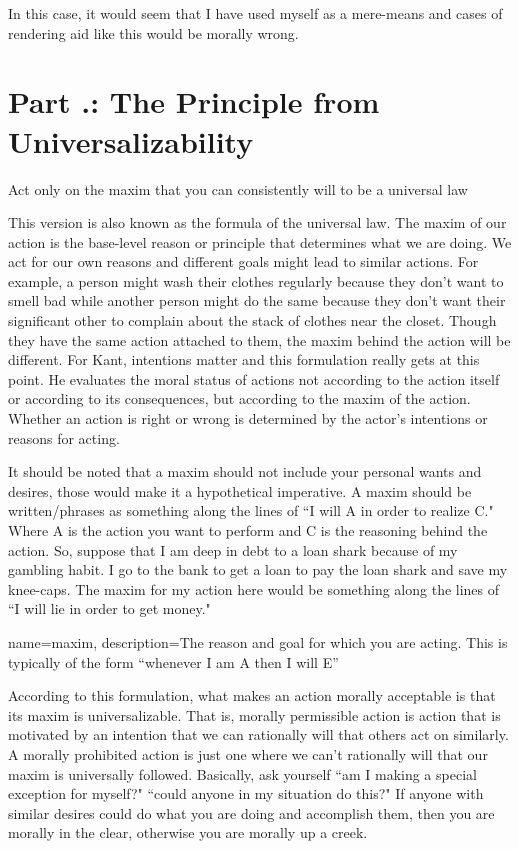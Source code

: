 In this case, it would seem that I have used myself as a mere-means and cases of rendering aid like this would be morally wrong.    
\section{Part \thechapcount.\theseccount: The Principle from Universalizability}
\begin{center}
Act only on the maxim that you can consistently will to be a universal law
\end{center}
This version is also known as the formula of the universal law. The maxim of our action is the base-level reason or principle that determines what we are doing. We act for our own reasons and different goals might lead to similar actions. For example, a person might wash their clothes regularly because they don't want to smell bad while another person might do the same because they don't want their significant other to complain about the stack of clothes near the closet. Though they have the same action attached to them, the maxim behind the action will be different.  For Kant, intentions matter and this formulation really gets at this point. He evaluates the moral status of actions not according to the action itself or according to its consequences, but according to the maxim of the action. Whether an action is right or wrong  is determined by the actor’s intentions or reasons for acting.

It should be noted that a \gls{maxim} should not include your personal wants and desires, those would make it a hypothetical imperative. A maxim should be written/phrases as something along the lines of ``I will A in order to realize C." Where A is the action you want to perform and C is the reasoning behind the action. So, suppose that I am deep in debt to a loan shark because of my gambling habit. I go to the bank to get a loan to pay the loan shark and save my knee-caps. The maxim for my action here would be something along the lines of ``I will lie in order to get money."

{
  name=maxim,
  description={The reason and goal for which you are acting. This is typically of the form ``whenever I am A then I will E''}
}


According to this formulation, what makes an action morally acceptable is that its maxim is universalizable. That is, morally permissible action is action that is motivated by an intention that we can rationally will that others act on similarly. A morally prohibited action is just one where we can’t rationally will that our maxim is universally followed. Basically, ask yourself ``am I making a special exception for myself?" ``could anyone in my situation do this?" If anyone with similar desires could do what you are doing and accomplish them, then you are morally in the clear, otherwise you are morally up a creek.

